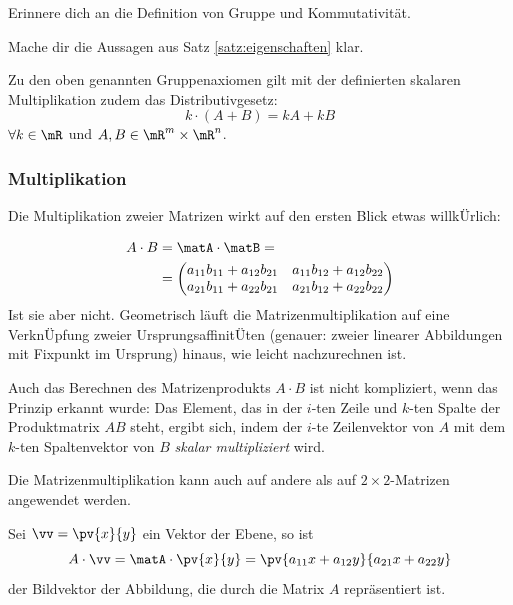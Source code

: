\documentclass[%
11pt,%
twoside,%
titlepage,%
german,%
headsepline%
]{scrartcl}
\begin{document}
\begin{ueb}
Erinnere dich an die Definition von Gruppe und Kommutativität.
\end{ueb}

\begin{ueb}
Mache dir die Aussagen aus Satz \ref{satz:eigenschaften} klar.
\end{ueb}

\begin{bem}
Zu den oben genannten Gruppenaxiomen gilt mit der definierten skalaren Multiplikation
zudem das Distributivgesetz:
$$k\cdot(A+B)=kA+kB$$
$\forall k\in\mR$ und $A,B\in\mR^m\times\mR^n$.
\end{bem}

\subsubsection{Multiplikation}
Die
Multiplikation zweier Matrizen wirkt auf den ersten Blick etwas willk\"Urlich:

\begin{align*}
A\cdot B&=\matA\cdot\matB=\\
&=
\begin{pmatrix}
a_{11}b_{11}+a_{12}b_{21} & a_{11}b_{12}+a_{12}b_{22}\\
a_{21}b_{11}+a_{22}b_{21} & a_{21}b_{12}+a_{22}b_{22}
\end{pmatrix}
\end{align*}
Ist sie aber nicht. Geometrisch läuft die Matrizenmultiplikation auf eine Verkn\"Upfung zweier Ursprungsaffinit\"Uten (genauer: zweier linearer Abbildungen mit Fixpunkt im Ursprung) hinaus, wie leicht nachzurechnen ist.

Auch das Berechnen des Matrizenprodukts $A\cdot B$ ist nicht kompliziert, wenn das Prinzip erkannt wurde: Das Element, das in der $i$-ten Zeile und $k$-ten Spalte der Produktmatrix $AB$ steht, ergibt sich, indem der $i$-te Zeilenvektor von $A$ mit dem $k$-ten Spaltenvektor von $B$ \emph{skalar multipliziert} wird.

\begin{bem}
Die Matrizenmultiplikation kann auch auf andere als auf $2\times2$-Matrizen angewendet werden.
\end{bem}

\begin{bsp}
Sei $\vv=\pv{x}{y}$ ein Vektor der Ebene, so ist
$$A\cdot\vv=\matA\cdot\pv{x}{y}=\pv{a_{11}x+a_{12}y}{a_{21}x+a_{22}y}$$
der Bildvektor der Abbildung, die durch die Matrix $A$ repräsentiert ist.
\end{bsp}
\end{document}
